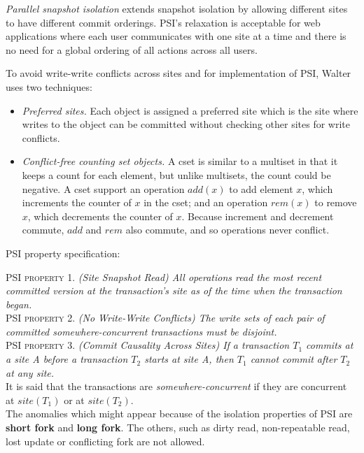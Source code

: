\documentclass[a4paper]{article}
\begin{document}
\textit{Parallel snapshot isolation} extends snapshot isolation by allowing different sites to have different commit orderings. PSI's relaxation is acceptable for web applications where each user communicates with one site at a time and there is no need for a global ordering of all actions across all users. 

To avoid write-write conflicts across sites and for implementation of PSI, Walter uses two techniques:
\begin{itemize}
\item \textit{Preferred sites.} Each object is assigned a preferred site which is the site where writes to the object can be committed without checking other sites for write conflicts.
\item \textit{Conflict-free counting set objects.} A cset is similar to a multiset in that it keeps a count for each element, but unlike multisets, the count could be negative. A cset support an operation $add(x)$ to add element $x$, which increments the counter of $x$ in the cset; and an operation $rem(x)$ to remove $x$, which decrements the counter of $x$. Because increment and decrement commute, $add$ and $rem$ also commute, and so operations never conflict. 
\end{itemize}

PSI property specification:

PSI \textsc{property} 1. \textit{(Site Snapshot Read) All operations read the most recent committed version at the transaction's site as of the time when the transaction began.}\\

PSI \textsc{property} 2. \textit{(No Write-Write Conflicts) The write sets of each pair of committed somewhere-concurrent transactions must be disjoint.}\\

PSI \textsc{property} 3. \textit{(Commit Causality Across Sites) If a transaction $T_{1}$ commits at a site A before a transaction $T_{2}$ starts at site A, then $T_{1}$ cannot commit after $T_{2}$ at any site.}\\

It is said that the transactions are \textit{somewhere-concurrent} if they are concurrent at $site(T_{1})$ or at $site(T_{2})$.
\\
The anomalies which might appear because of the isolation properties of PSI are \textbf{short fork} and \textbf{long fork}. The others, such as dirty read, non-repeatable read, lost update or conflicting fork are not allowed. 
\end{document}
